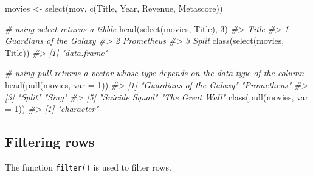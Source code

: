 \documentclass[
]{book}
\newenvironment{Shaded}{\begin{snugshade}}{\end{snugshade}}
\newcommand{\AttributeTok}[1]{\textcolor[rgb]{0.77,0.63,0.00}{#1}}
\newcommand{\CommentTok}[1]{\textcolor[rgb]{0.56,0.35,0.01}{\textit{#1}}}
\newcommand{\DecValTok}[1]{\textcolor[rgb]{0.00,0.00,0.81}{#1}}
\newcommand{\FunctionTok}[1]{\textcolor[rgb]{0.00,0.00,0.00}{#1}}
\newcommand{\NormalTok}[1]{#1}
\newcommand{\OtherTok}[1]{\textcolor[rgb]{0.56,0.35,0.01}{#1}}
\newcommand{\StringTok}[1]{\textcolor[rgb]{0.31,0.60,0.02}{#1}}
\begin{document}
\begin{Shaded}
\begin{Highlighting}[]
\NormalTok{movies }\OtherTok{\textless{}{-}} \FunctionTok{select}\NormalTok{(mov, }\FunctionTok{c}\NormalTok{(}\StringTok{\textquotesingle{}Title\textquotesingle{}}\NormalTok{, }\StringTok{\textquotesingle{}Year\textquotesingle{}}\NormalTok{, }\StringTok{\textquotesingle{}Revenue\textquotesingle{}}\NormalTok{, }\StringTok{\textquotesingle{}Metascore\textquotesingle{}}\NormalTok{))}

\CommentTok{\# using select returns a tibble}
\FunctionTok{head}\NormalTok{(}\FunctionTok{select}\NormalTok{(movies, }\StringTok{\textquotesingle{}Title\textquotesingle{}}\NormalTok{), }\DecValTok{3}\NormalTok{)}
\CommentTok{\#\textgreater{}                     Title}
\CommentTok{\#\textgreater{} 1 Guardians of the Galaxy}
\CommentTok{\#\textgreater{} 2              Prometheus}
\CommentTok{\#\textgreater{} 3                   Split}
\FunctionTok{class}\NormalTok{(}\FunctionTok{select}\NormalTok{(movies, }\StringTok{\textquotesingle{}Title\textquotesingle{}}\NormalTok{))}
\CommentTok{\#\textgreater{} [1] "data.frame"}

\CommentTok{\# using pull returns a vector whose type depends on the data type of the column}
\FunctionTok{head}\NormalTok{(}\FunctionTok{pull}\NormalTok{(movies, }\AttributeTok{var =} \DecValTok{1}\NormalTok{))}
\CommentTok{\#\textgreater{} [1] "Guardians of the Galaxy" "Prometheus"             }
\CommentTok{\#\textgreater{} [3] "Split"                   "Sing"                   }
\CommentTok{\#\textgreater{} [5] "Suicide Squad"           "The Great Wall"}
\FunctionTok{class}\NormalTok{(}\FunctionTok{pull}\NormalTok{(movies, }\AttributeTok{var =} \DecValTok{1}\NormalTok{))}
\CommentTok{\#\textgreater{} [1] "character"}
\end{Highlighting}
\end{Shaded}

\hypertarget{tr-filter-rows}{%
\subsection{Filtering rows}\label{tr-filter-rows}}

The function \texttt{filter()} is used to filter rows.
\end{document}
